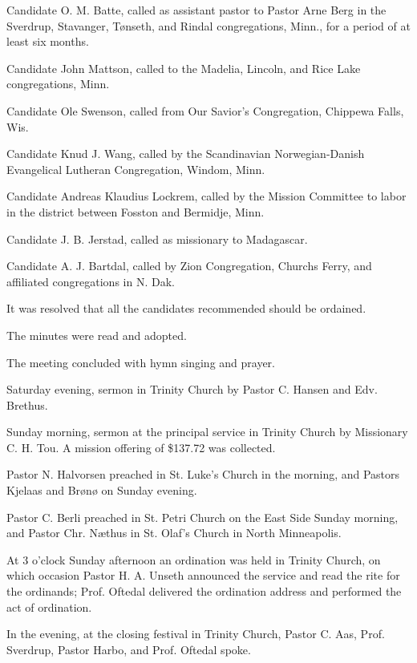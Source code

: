 Candidate O. M. Batte, called as assistant pastor to Pastor Arne Berg in the Sverdrup, Stavanger, Tønseth, and Rindal congregations, Minn., for a period of at least six months.

Candidate John Mattson, called to the Madelia, Lincoln, and Rice Lake congregations, Minn.

Candidate Ole Swenson, called from Our Savior’s Congregation, Chippewa Falls, Wis.

Candidate Knud J. Wang, called by the Scandinavian Norwegian-Danish Evangelical Lutheran Congregation, Windom, Minn.

Candidate Andreas Klaudius Lockrem, called by the Mission Committee to labor in the district between Fosston and Bermidje, Minn.

Candidate J. B. Jerstad, called as missionary to Madagascar.

Candidate A. J. Bartdal, called by Zion Congregation, Churchs Ferry, and affiliated congregations in N. Dak.

It was resolved that all the candidates recommended should be ordained.

The minutes were read and adopted.

The meeting concluded with hymn singing and prayer.

Saturday evening, sermon in Trinity Church by Pastor C. Hansen and Edv. Brethus.

Sunday morning, sermon at the principal service in Trinity Church by Missionary C. H. Tou. A mission offering of \$137.72 was collected.

Pastor N. Halvorsen preached in St. Luke’s Church in the morning, and Pastors Kjelaas and Brønø on Sunday evening.

Pastor C. Berli preached in St. Petri Church on the East Side Sunday morning, and Pastor Chr. Næthus in St. Olaf’s Church in North Minneapolis.

At 3 o’clock Sunday afternoon an ordination was held in Trinity Church, on which occasion Pastor H. A. Unseth announced the service and read the rite for the ordinands; Prof. Oftedal delivered the ordination address and performed the act of ordination.

In the evening, at the closing festival in Trinity Church, Pastor C. Aas, Prof. Sverdrup, Pastor Harbo, and Prof. Oftedal spoke.
